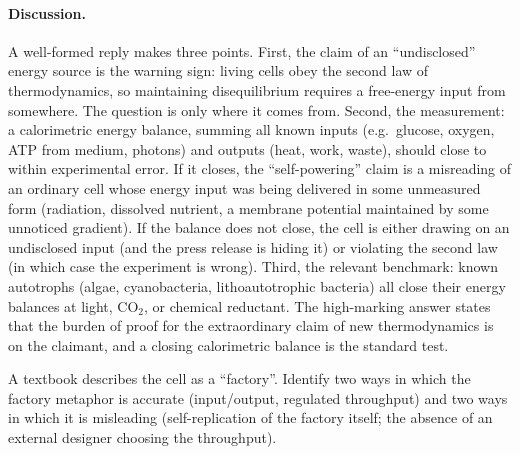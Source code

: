 \paragraph{Discussion.}
A well-formed reply makes three points. First, the claim of an
``undisclosed'' energy source is the warning sign: living cells obey
the second law of thermodynamics, so maintaining disequilibrium
requires a free-energy input from somewhere. The question is only
where it comes from. Second, the measurement: a calorimetric energy
balance, summing all known inputs (e.g.\ glucose, oxygen, ATP from
medium, photons) and outputs (heat, work, waste), should close to
within experimental error. If it closes, the ``self-powering'' claim
is a misreading of an ordinary cell whose energy input was being
delivered in some unmeasured form (radiation, dissolved nutrient, a
membrane potential maintained by some unnoticed gradient). If the
balance does not close, the cell is either drawing on an undisclosed
input (and the press release is hiding it) or violating the second
law (in which case the experiment is wrong). Third, the relevant
benchmark: known autotrophs (algae, cyanobacteria, lithoautotrophic
bacteria) all close their energy balances at light, CO$_2$, or
chemical reductant. The high-marking answer states that the burden
of proof for the extraordinary claim of new thermodynamics is on the
claimant, and a closing calorimetric balance is the standard test.

\begin{exercise}
A textbook describes the cell as a ``factory''. Identify two ways in
which the factory metaphor is accurate (input/output, regulated
throughput) and two ways in which it is misleading (self-replication
of the factory itself; the absence of an external designer choosing
the throughput).
\end{exercise}

